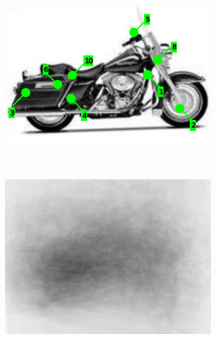 \begin{figure}[ht]
\begin{subfigure}[b]{0.35\linewidth} \centering 
	\includegraphics[width=\linewidth]{fig/reg/onebike_after3.pdf}
	\label{fig/reg/concept5}
\end{subfigure} \\
\begin{subfigure}[b]{0.35\linewidth} \centering 
	\includegraphics[width=\linewidth]{fig/reg/avgbike_before.png}
	\label{fig/reg/concept2}
\end{subfigure} \hspace{5mm}
\begin{subfigure}[b]{0.35\linewidth} \centering 

\end{subfigure}
\end{figure}
